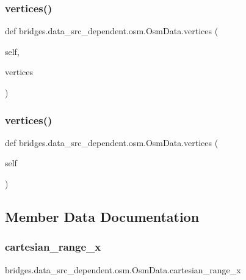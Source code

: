 \subsubsection{\texorpdfstring{vertices()}{vertices()}\hspace{0.1cm}{\footnotesize\ttfamily [2/3]}}
{\footnotesize\ttfamily def bridges.\+data\+\_\+src\+\_\+dependent.\+osm.\+Osm\+Data.\+vertices (\begin{DoxyParamCaption}\item[{}]{self,  }\item[{\mbox{\hyperlink{classbridges_1_1data__src__dependent_1_1osm_1_1_osm_data_aa2bc633ab0d64a560165a1d55cc1f3a4}{Vertex\+List}}}]{vertices }\end{DoxyParamCaption})}

\mbox{\label{classbridges_1_1data__src__dependent_1_1osm_1_1_osm_data_a9d254d1ef4043909d4d2bd4427daae39}} 
\subsubsection{\texorpdfstring{vertices()}{vertices()}\hspace{0.1cm}{\footnotesize\ttfamily [3/3]}}
{\footnotesize\ttfamily def bridges.\+data\+\_\+src\+\_\+dependent.\+osm.\+Osm\+Data.\+vertices (\begin{DoxyParamCaption}\item[{}]{self }\end{DoxyParamCaption})}



\subsection{Member Data Documentation}
\mbox{\label{classbridges_1_1data__src__dependent_1_1osm_1_1_osm_data_a81e77104409461472dcaa68e68eb23da}} 
\subsubsection{\texorpdfstring{cartesian\_range\_x}{cartesian\_range\_x}}
{\footnotesize\ttfamily bridges.\+data\+\_\+src\+\_\+dependent.\+osm.\+Osm\+Data.\+cartesian\+\_\+range\+\_\+x}


